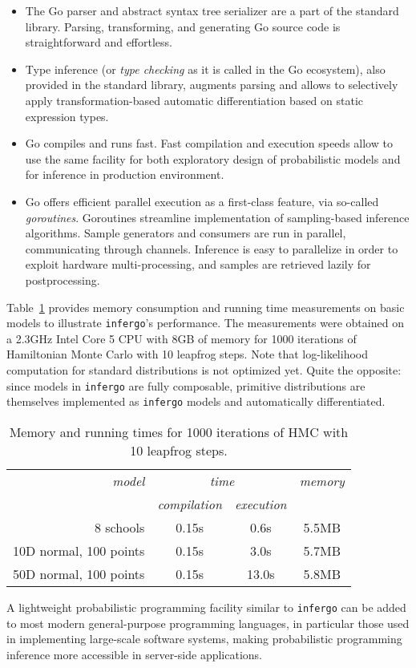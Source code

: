 \documentclass[sigplan,review]{acmart}\settopmatter{printfolios=true,printccs=false,printacmref=false}
\begin{document}
\begin{sloppypar}
\begin{itemize}
    \item The Go parser and abstract syntax tree serializer are
        a part of the standard library. Parsing, transforming,
        and generating Go source code is straightforward and
        effortless.
	\item Type inference (or \textit{type checking} as it is
		called in the Go ecosystem), also provided in the
		standard library, augments parsing and allows to
		selectively apply transformation-based automatic
		differentiation  based on static expression types. 
	\item Go compiles and runs fast. Fast compilation and
		execution speeds allow to use the same facility for both
		exploratory design of probabilistic models and for
		inference in production environment.
	\item Go offers efficient parallel execution as a
		first-class feature, via so-called \textit{goroutines}.
		Goroutines streamline implementation of sampling-based
		inference algorithms. Sample generators and consumers
		are run in parallel, communicating through channels. 
		Inference is easy to parallelize in order to exploit
		hardware multi-processing, and samples are retrieved
		lazily for postprocessing. 
\end{itemize}

Table~\ref{tab:memory-runtime} provides memory consumption and
running time measurements on basic models to
illustrate  \texttt{infergo}'s performance.
The measurements were obtained on a 2.3GHz Intel Core 5
CPU with 8GB of memory for 1000 iterations of Hamiltonian Monte
Carlo with 10 leapfrog steps. Note that log-likelihood computation 
for standard distributions is not optimized yet. Quite the
opposite: since models in \texttt{infergo} are fully composable,
primitive distributions are themselves implemented as
\texttt{infergo} models and automatically differentiated.

{\smaller
\begin{table}[H]
	\caption{Memory and running times for 1000 iterations
	of HMC with 10 leapfrog steps.}
	\label{tab:memory-runtime}
	\begin{tabular}{r | c |  c | c}
		{\it model}  & \multicolumn{2}{c|}{\it time} & {\it memory} \\ 
		 & {\it compilation} & {\it execution} & \\\hline
		8 schools & 0.15s & 0.6s & 5.5MB \\
		10D normal, 100 points & 0.15s & 3.0s & 5.7MB \\
		50D normal, 100 points & 0.15s & 13.0s & 5.8MB 
	\end{tabular}
\end{table}}

A lightweight probabilistic programming facility similar to
\texttt{infergo} can be added to most modern general-purpose
programming languages, in particular those used in implementing
large-scale software systems, making probabilistic
programming inference more accessible in server-side
applications.
\end{sloppypar}


\end{document}
